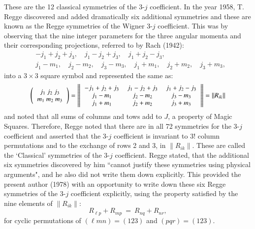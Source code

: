 These are the 12 classical symmetries of the 3-$j$ coefficient. In the year 1958, T. Regge discovered and added dramatically six additional symmetries and these are known as the Regge symmetries of the Wigner 3-$j$ coefficient. This was by observing that the nine integer parameters for the three angular momenta and their corresponding projections, referred to by Rach (1942):
\begin{equation}
\begin{split}
& -j_1+j_2+j_3, \quad  j_1-j_2+j_3, \quad j_1+j_2-j_3,\\
& j_1-m_1,\quad j_2-m_2,\quad j_3-m_3,\quad j_1+m_1,\quad j_2+m_2,\quad j_3+m_3,\label{chap29-eq10}
\end{split}
\end{equation}
into a $3\times 3$ square symbol and represented the same as:
{\begin{equation}\fontsize{9.5pt}{11pt}\selectfont
\left(
\begin{tabular}{ccc}
$j_1\ j_2\ j_3$\\ 
$m_1\ m_2\ m_3$\\ 
\end{tabular} 
\right) 
= \left\| 
\begin{tabular}{ccc}
$-j_1+j_2+j_3$ & $j_1-j_2+j_3$ &  $j_1+j_2-j_3$\\
$j_1-m_1$ & $j_2-m_2$ & $j_3-m_3$\\
$j_1+m_1$ & $j_2+m_2$ & $j_3+m_3$\\
\end{tabular} 
\right\|
=\|R_{ik}\| \label{chap29-eq11}
\end{equation}}\relax
and noted that all sums of columns and tows add to $J$, a property of Magic Squares. Therefore, Regge noted that there are in all 72 symmetries for the 3-$j$ coefficient and asserted that the 3-$j$ coefficient is invariant to 3! column permutations and to the exchange of rows 2 and 3, in $\|R_{ik}\|$. These are called the `Classical' symmetries of the 3-$j$ coefficient. Regge stated, that the additional six symmetries discovered by him ``cannot justify these symmetries using physical arguments", and he also did not write them down explicitly. This provided the present author (1978) with an opportunity to write down these six Regge symmetries of the 3-$j$ coefficient explicitly, using the property satisfied by the nine elements of $\|R_{ik}\|$:
\begin{equation}
R_{\ell p} + R_{mp}\ =\ R_{nq} + R_{nr},\label{chap29-eq12}
\end{equation}
for cyclic permutations of $(\ell mn)=(123)$ and $(pqr)=(123)$. 

